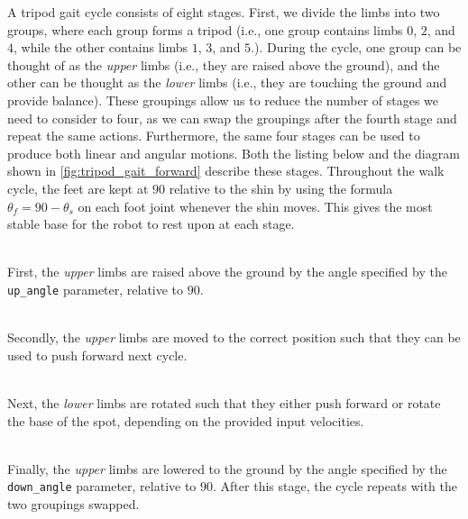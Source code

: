 A tripod gait cycle consists of eight stages. First, we divide the limbs into two groups, where each group forms a tripod (i.e., one group contains limbs $0$, $2$, and $4$, while the other contains limbs $1$, $3$, and $5$.). During the cycle, one group can be thought of as the \emph{upper} limbs (i.e., they are raised above the ground), and the other can be thought as the \emph{lower} limbs (i.e., they are touching the ground and provide balance). These groupings allow us to reduce the number of stages we need to consider to four, as we can swap the groupings after the fourth stage and repeat the same actions. Furthermore, the same four stages can be used to produce both linear and angular motions. Both the listing below and the diagram shown in \autoref{fig:tripod_gait_forward} describe these stages. Throughout the walk cycle, the feet are kept at $90$\textdegree{} relative to the shin by using the formula $\theta_f = 90 - \theta_s$ on each foot joint whenever the shin moves. This gives the most stable base for the robot to rest upon at each stage.

\begin{description}[labelindent=\parindent]
	\item[1. Raise] \hfill \\
	First, the \emph{upper} limbs are raised above the ground by the angle specified by the \texttt{up\_angle} parameter, relative to $90$\textdegree{}.  

	\item[2. Reset] \hfill \\
	Secondly, the \emph{upper} limbs are moved to the correct position such that they can be used to push forward next cycle.

	\item[3. Push] \hfill \\
	Next, the \emph{lower} limbs are rotated such that they either push forward or rotate the base of the spot, depending on the provided input velocities.

	\item[4. Lower] \hfill \\
	Finally, the \emph{upper} limbs are lowered to the ground by the angle specified by the \texttt{down\_angle} parameter, relative to $90$\textdegree{}. After this stage, the cycle repeats with the two groupings swapped.
\end{description}

